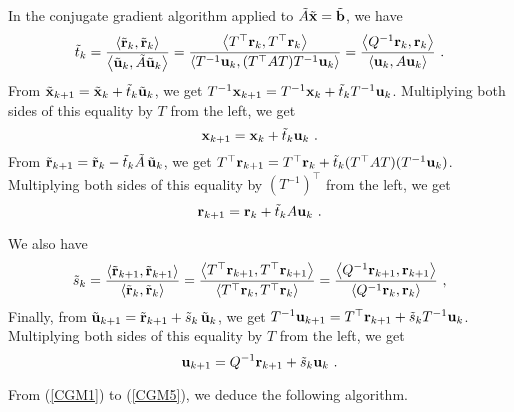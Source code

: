 In the conjugate gradient algorithm applied to
$\tilde{A} \tilde{\mathbf{x}} = \tilde{\mathbf{b}}$, we have
\begin{equation} \label{CGM1}
\tilde{t}_k =
\frac{\left\langle{\tilde{\mathbf{r}}_k} , {\tilde{\mathbf{r}}_k}\right\rangle}
{\left\langle{\tilde{\mathbf{u}}_k} , {\tilde{A} \tilde{\mathbf{u}}_k}\right\rangle}
= \frac{\left\langle{T^\top\mathbf{r}_k} , {T^\top\mathbf{r}_k}\right\rangle}
{\left\langle{T^{-1}\mathbf{u}_k} , {(T^\top A T)T^{-1}\mathbf{u}_k}\right\rangle}
= \frac{\left\langle{Q^{-1}\mathbf{r}_k} , {\mathbf{r}_k}\right\rangle}
{\left\langle{\mathbf{u}_k} , {A\mathbf{u}_k}\right\rangle} \ .
\end{equation}
From
$\tilde{\mathbf{x}}_{k+1} = \tilde{\mathbf{x}}_k + \tilde{t}_k \tilde{\mathbf{u}}_k$, we get
$T^{-1}\mathbf{x}_{k+1} = T^{-1}\mathbf{x}_k + \tilde{t}_k T^{-1} \mathbf{u}_k$.
Multiplying both sides of this equality by $T$ from the left,
we get
\begin{equation} \label{CGM2}
\mathbf{x}_{k+1} = \mathbf{x}_k + \tilde{t}_k \mathbf{u}_k \ .
\end{equation}
From 
$\tilde{\mathbf{r}}_{k+1} = \tilde{\mathbf{r}}_k - \tilde{t}_k \tilde{A} \, \tilde{\mathbf{u}}_k$,
we get
$T^\top\mathbf{r}_{k+1} = T^\top\mathbf{r}_k
+ \tilde{t}_k (T^\top A T)(T^{-1} \mathbf{u}_k)$.  Multiplying both sides of
this equality by $(T^{-1})^\top$ from the left, we get
\begin{equation} \label{CGM3}
\mathbf{r}_{k+1} = \mathbf{r}_k + \tilde{t}_k A \mathbf{u}_k \ .
\end{equation}

We also have
\begin{equation} \label{CGM4}
\tilde{s}_k =
\frac{\left\langle{\tilde{\mathbf{r}}_{k+1}} , {\tilde{\mathbf{r}}_{k+1}}\right\rangle}
{\left\langle{\tilde{\mathbf{r}}_k} , {\tilde{\mathbf{r}}_k}\right\rangle}
= \frac{\left\langle{T^\top\mathbf{r}_{k+1}} , {T^\top\mathbf{r}_{k+1}}\right\rangle}
{\left\langle{T^\top\mathbf{r}_k} , {T^\top \mathbf{r}_k}\right\rangle}
= \frac{\left\langle{Q^{-1}\mathbf{r}_{k+1}} , {\mathbf{r}_{k+1}}\right\rangle}
{\left\langle{Q^{-1}\mathbf{r}_k} , {\mathbf{r}_k}\right\rangle} \ ,
\end{equation}
Finally, from
$\tilde{\mathbf{u}}_{k+1} = \tilde{\mathbf{r}}_{k+1} + \tilde{s}_k \, \tilde{\mathbf{u}}_k$, we get
$T^{-1}\mathbf{u}_{k+1} = T^\top \mathbf{r}_{k+1} + \tilde{s}_k T^{-1} \mathbf{u}_k$.
Multiplying both sides of this equality by $T$ from the left,
we get
\begin{equation} \label{CGM5}
\VEC{u}_{k+1} = Q^{-1} \VEC{r}_{k+1} + \tilde{s}_k \VEC{u}_k \ .
\end{equation}

From (\ref{CGM1}) to (\ref{CGM5}), we deduce the following
algorithm.

